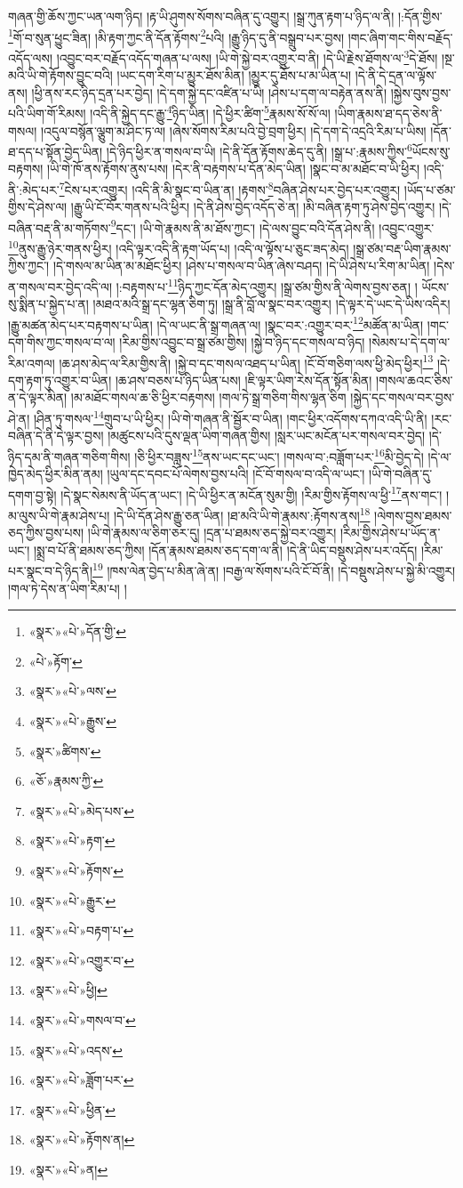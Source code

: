 གཞན་གྱི་ཆོས་ཀྱང་ཡན་ལག་ཉིད། །རྟ་ཡི་ཤུགས་སོགས་བཞིན་དུ་འགྱུར། །སྒྲ་ཀུན་རྟག་པ་ཉིད་ལ་ནི། །:དོན་གྱིས་\footnote{«སྣར་»«པེ་»དོན་གྱི་}གོ་བ་སུན་ཕྱུང་ཟིན། །མི་རྟག་ཀྱང་ནི་དོན་རྟོགས་\footnote{«པེ་»རྟོག་}པའི། །རྒྱུ་ཉིད་དུ་ནི་བསྒྲུབ་པར་བྱས། །གང་ཞིག་གང་གིས་བརྗོད་འདོད་ལས། །འབྱུང་བར་བརྗོད་འདོད་གཞན་པ་ལས། །ཡི་གེ་སྐྱེ་བར་འགྱུར་བ་ནི། །དེ་ཡི་རྗེས་ཐོགས་ལ་\footnote{«སྣར་»«པེ་»ལས་}དེ་ཐོས། །སྔ་མའི་ཡི་གེ་རྟོགས་བྱུང་བའི། །ཡང་དག་རིག་པ་མྱུར་ཐོས་མིན། །མྱུར་དུ་ཐོས་པ་མ་ཡིན་པ། །དེ་ནི་དེ་དྲན་ལ་ལྟོས་ནས། །ཕྱི་ནས་རང་ཉིད་དྲན་པར་བྱེད། །དེ་དག་སྐྱེ་དང་འཛིན་པ་ཡི། །ཤེས་པ་དག་ལ་བརྟེན་ནས་ནི། །སྐྱེས་བུས་བྱས་པའི་ཡིག་གོ་རིམས། །འདི་ནི་སྐྱེད་དང་རྒྱུ་\footnote{«སྣར་»«པེ་»རྒྱུས་}ཉིད་ཡིན། །དེ་ཕྱིར་ཚིག་\footnote{«སྣར་»ཚིགས་}རྣམས་སོ་སོ་ལ། །ཡིག་རྣམས་ཐ་དད་ཅེས་ནི་གསལ། །འདུལ་བསྙོན་ལྕུག་མ་ཤིང་ཏ་ལ། །ཞེས་སོགས་རིམ་པའི་བྱེ་བྲག་ཕྱིར། །དེ་དག་དེ་འདྲའི་རིམ་པ་ཡིས། །དོན་ཐ་དད་པ་སྟོན་བྱེད་ཡིན། །དེ་ཉིད་ཕྱིར་ན་གསལ་བ་ཡི། །དེ་ནི་དོན་རྟོགས་ཆེད་དུ་ནི། །སྒྲ་པ་:རྣམས་ཀྱིས་\footnote{«ཅོ་»རྣམས་ཀྱི་}ཡོངས་སུ་བརྟགས། །ཡི་གེ་ཁོ་ནས་རྟོགས་ནུས་པས། །དེར་ནི་བརྟགས་པ་དོན་མེད་ཡིན། །སྣང་བ་མ་མཐོང་བ་ཡི་ཕྱིར། །འདི་ནི་:མེད་པར་\footnote{«སྣར་»«པེ་»མེད་པས་}ངེས་པར་འགྱུར། །འདི་ནི་མི་སྣང་བ་ཡིན་ན། །རྟགས་\footnote{«སྣར་»«པེ་»རྟག་}བཞིན་ཤེས་པར་བྱེད་པར་འགྱུར། །ཡོད་པ་ཙམ་གྱིས་དེ་ཤེས་ལ། །རྒྱུ་ཡི་ངོ་བོར་གནས་པའི་ཕྱིར། །དེ་ནི་ཤེས་བྱེད་འདོད་ཅེ་ན། །མི་བཞིན་རྟག་ཏུ་ཤེས་བྱེད་འགྱུར། །དེ་བཞིན་བརྡ་ནི་མ་གཏོགས་\footnote{«སྣར་»«པེ་»རྟོགས་}དང་། །ཡི་གེ་རྣམས་ནི་མ་ཐོས་ཀྱང་། །དེ་ལས་བྱུང་བའི་དོན་ཤེས་ནི། །འབྱུང་འགྱུར་\footnote{«སྣར་»«པེ་»རྒྱུར་}ནུས་རྒྱུ་ཉེར་གནས་ཕྱིར། །འདི་ལྟར་འདི་ནི་རྟག་ཡོད་པ། །འདི་ལ་ལྟོས་པ་ཅུང་ཟད་མེད། །སྒྲ་ཙམ་བརྡ་ཡིག་རྣམས་ཀྱིས་ཀྱང་། །དེ་གསལ་མ་ཡིན་མ་མཐོང་ཕྱིར། །ཤེས་པ་གསལ་བ་ཡིན་ཞེས་བཤད། །དེ་ཡི་ཤེས་པ་རིག་མ་ཡིན། །དེས་ན་གསལ་བར་བྱེད་འདི་ལ། །:བརྟགས་པ་\footnote{«སྣར་»«པེ་»བརྟག་པ་}ཉིད་ཀྱང་དོན་མེད་འགྱུར། །སྒྲ་ཙམ་གྱིས་ནི་ལེགས་བྱས་ཅན། །
ཡོངས་སུ་སྨིན་པ་སྐྱེད་པ་ན། །མཐའ་མའི་སྒྲ་དང་ལྷན་ཅིག་ཏུ། །སྒྲ་ནི་བློ་ལ་སྣང་བར་འགྱུར། །དེ་ལྟར་དེ་ཡང་དེ་ཡིས་འདིར། །རྒྱུ་མཚན་མེད་པར་བརྟགས་པ་ཡིན། །དེ་ལ་ཡང་ནི་སྒྲ་གཞན་ལ། །སྣང་བར་:འགྱུར་བར་\footnote{«སྣར་»«པེ་»འགྱུར་བ་}མཚོན་མ་ཡིན། །གང་དག་གིས་ཀྱང་གསལ་བ་ལ། །རིམ་གྱིས་འབྱུང་བ་སྒྲ་ཙམ་གྱིས། །སྐྱེ་བ་ཉིད་དང་གསལ་བ་ཉིད། །སེམས་པ་དེ་དག་ལ་རིམ་འགལ། །ཆ་ཤས་མེད་ལ་རིམ་གྱིས་ནི། །སྐྱེ་བ་དང་གསལ་འཐད་པ་ཡིན། །ངོ་བོ་གཅིག་ལས་ཕྱི་མེད་ཕྱིར།\footnote{«སྣར་»«པེ་»ཕྱི།} །དེ་དག་རྟག་ཏུ་འགྱུར་བ་ཡིན། །ཆ་ཤས་བཅས་པ་ཉིད་ཡིན་པས། །ཇི་ལྟར་ཡིག་རེས་དོན་སྟོན་མིན། །གསལ་ཆའང་ཅིས་ན་དེ་ལྟར་མིན། །མ་མཐོང་གསལ་ཆ་ཅི་ཕྱིར་བརྟགས། །གལ་ཏེ་སྒྲ་གཅིག་གིས་ལྷན་ཅིག །སྐྱེད་དང་གསལ་བར་བྱས་ཤེ་ན། །ཤིན་ཏུ་གསལ་\footnote{«སྣར་»«པེ་»གསལ་བ་}གྲུབ་པ་ཡི་ཕྱིར། །ཡི་གེ་གཞན་ནི་སྦྱོར་བ་ཡིན། །གང་ཕྱིར་འདོགས་དཀའ་འདི་ཡི་ནི། །རང་བཞིན་དེ་ནི་དེ་ལྟར་བྱས། །མཚུངས་པའི་དུས་ལྡན་ཡིག་གཞན་གྱིས། །སླར་ཡང་མངོན་པར་གསལ་བར་བྱེད། །དེ་ཉིད་དམ་ནི་གཞན་གཅིག་གིས། །ཅི་ཕྱིར་བཟླས་\footnote{«སྣར་»«པེ་»འདས་}ནས་ཡང་དང་ཡང་། །གསལ་བ་:བཟློག་པར་\footnote{«སྣར་»«པེ་»ཟློག་པར་}མི་བྱེད་དེ། །དེ་ལ་ཁྱེད་མེད་ཕྱིར་མིན་ནམ། །ཡུལ་དང་དབང་པོ་ལེགས་བྱས་པའི། །ངོ་བོ་གསལ་བ་འདི་ལ་ཡང་། །ཡི་གེ་བཞིན་དུ་དགག་བྱ་སྟེ། །དེ་སྣང་སེམས་ནི་ཡོད་ན་ཡང་། །དེ་ཡི་ཕྱིར་ན་མངོན་སུམ་གྱི། །རིམ་གྱིས་རྟོགས་ལ་ཕྱི་\footnote{«སྣར་»«པེ་»ཕྱིན་}ནས་གང་། །མ་ལུས་ཡི་གེ་རྣམ་ཤེས་པ། །དེ་ཡི་དོན་ཤེས་རྒྱུ་ཅན་ཡིན། །ཐ་མའི་ཡི་གེ་རྣམས་:རྟོགས་ནས།\footnote{«སྣར་»«པེ་»རྟོགས་ན།} །ལེགས་བྱས་ཐམས་ཅད་ཀྱིས་བྱས་པས། །ཡི་གེ་རྣམས་ལ་ཅིག་ཅར་དུ། །དྲན་པ་ཐམས་ཅད་སྐྱེ་བར་འགྱུར། །རིམ་གྱིས་ཤེས་པ་ཡོད་ན་ཡང་། །སྨྲ་བ་པོ་ནི་ཐམས་ཅད་ཀྱིས། །དོན་རྣམས་ཐམས་ཅད་དག་ལ་ནི། །དེ་ནི་ཡིད་བསྡུས་ཤེས་པར་འདོད། །རིམ་པར་སྣང་བ་དེ་ཉིད་ནི།\footnote{«སྣར་»«པེ་»ན།} །ཁས་ལེན་བྱེད་པ་མིན་ཞེ་ན། །བརྒྱ་ལ་སོགས་པའི་ངོ་བོ་ནི། །དེ་བསྡུས་ཤེས་པ་སྐྱེ་མི་འགྱུར། །གལ་ཏེ་དེས་ན་ཡིག་རིམ་པ། །
